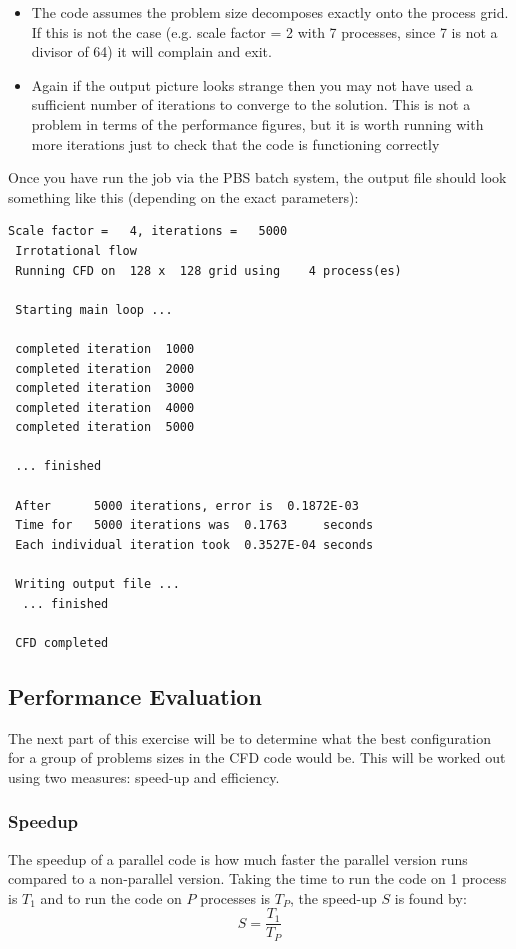 \documentclass{article}
\begin{document}
\begin{itemize}

\item The code assumes the problem size decomposes exactly onto the
  process grid. If this is not the case (e.g. scale factor = 2 with 7
  processes, since 7 is not a divisor of 64) it will complain and
  exit.

\item Again if the output picture looks strange then you may not have used a
  sufficient number of iterations to converge to the solution. This is
  not a problem in terms of the performance figures, but it is worth
  running with more iterations just to check that the code is
  functioning correctly
\end{itemize}

Once you have run the job via the PBS batch system, the output file
should look something like this (depending on the exact parameters):

\begin{lstlisting}[frame=single]
 Scale factor =   4, iterations =   5000
 Irrotational flow
 Running CFD on  128 x  128 grid using    4 process(es)
 
 Starting main loop ...
 
 completed iteration  1000
 completed iteration  2000
 completed iteration  3000
 completed iteration  4000
 completed iteration  5000
 
 ... finished
 
 After      5000 iterations, error is  0.1872E-03
 Time for   5000 iterations was  0.1763     seconds
 Each individual iteration took  0.3527E-04 seconds
 
 Writing output file ...
  ... finished
 
 CFD completed
\end{lstlisting}



\subsection{Performance Evaluation}
The next part of this exercise will be to determine what the best
configuration for a group of problems sizes in the CFD code would
be. This will be worked out using two measures: speed-up and
efficiency.

\subsubsection{Speedup}
The speedup of a parallel code is how much faster the parallel version
runs compared to a non-parallel version. Taking the time to run the
code on 1 process is $T_1$ and to run the code on $P$ processes is
$T_P$, the speed-up $S$ is found by:
\begin{equation}
S = \frac{T_1}{T_P}
\end{equation}
\end{document}
